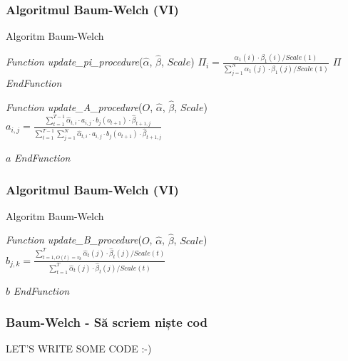 \begin{frame}[fragile, t]
	\frametitle{Algoritmul Baum-Welch (VI)}	
	\begin{algorithm}[H]
		\scriptsize
      	\caption{Algoritm Baum-Welch}
      	\label{alg-baum-welch}
      	 
      	\begin{algorithmic}[1]
      		\STATE \emph{Function update\_pi\_procedure}($\hat{\alpha}$, $\hat{\beta}$, $Scale$)
					\STATE $\Pi_i = \frac{\alpha_1(i) \cdot \beta_1(i) / Scale(1)}
										{\sum_{j=1}^{N}{\alpha_1(j) \cdot \beta_1(j) / Scale(1)}}$
				\ENDFOR
				\RETURN $\Pi$
      		\STATE \emph{EndFunction}
			
			\vspace*{0.5em} 
      		\STATE \emph{Function update\_A\_procedure}($O$, $\hat{\alpha}$, $\hat{\beta}$, $Scale$)
					\STATE $a_{i,j} = \frac{\sum_{t=1}^{T-1}{\hat{\alpha}_{t,i}\cdot a_{i,j} \cdot b_j(o_{t+1}) 
												\cdot \hat{\beta}_{t+1,j}}}
										{\sum_{t=1}^{T-1}\sum_{j=1}^{N}{\hat{\alpha}_{t,i}\cdot a_{i,j} 
										\cdot b_j(o_{t+1}) \cdot \hat{\beta}_{t+1,j}}}$
					\ENDFOR
				\ENDFOR
				
				\RETURN $a$
      		\STATE \emph{EndFunction}
		\end{algorithmic}
	\end{algorithm}  
\end{frame}


\begin{frame}[fragile]
	\frametitle{Algoritmul Baum-Welch (VI)}	
	\begin{algorithm}[H]
		\scriptsize
      	\caption{Algoritm Baum-Welch}
      	\label{alg-baum-welch}
      	 
      	\begin{algorithmic}[1]
      		\STATE \emph{Function update\_B\_procedure}($O$, $\hat{\alpha}$, $\hat{\beta}$, $Scale$)
					\STATE $b_{j,k} = \frac{\sum_{t=1,O(t)=v_k}^{T}
											{\hat{\alpha}_t(j) \cdot \hat{\beta}_t(j) / Scale(t)}}
										   {\sum_{t=1}^{T}
											{\hat{\alpha}_t(j) \cdot \hat{\beta}_t(j) / Scale(t)}}$
					\ENDFOR
				\ENDFOR
				
				\RETURN $b$
      		\STATE \emph{EndFunction}
		\end{algorithmic}
	\end{algorithm}  
\end{frame}


\begin{frame}
	\frametitle{Baum-Welch - Să scriem niște cod}
	\centering
	LET'S WRITE SOME CODE :-)
\end{frame}